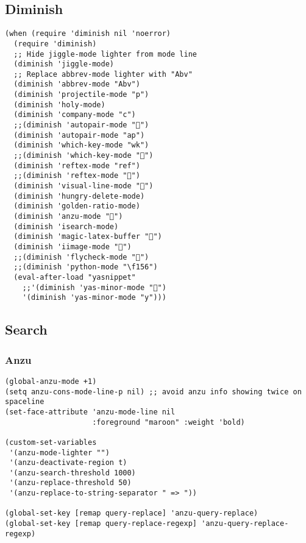 \documentclass[11pt]{article}
\begin{document}
\subsection{Diminish}
\label{sec:orgheadline25}
\begin{verbatim}
(when (require 'diminish nil 'noerror)
  (require 'diminish)
  ;; Hide jiggle-mode lighter from mode line
  (diminish 'jiggle-mode)
  ;; Replace abbrev-mode lighter with "Abv"
  (diminish 'abbrev-mode "Abv")
  (diminish 'projectile-mode "p")
  (diminish 'holy-mode)
  (diminish 'company-mode "c")
  ;;(diminish 'autopair-mode "")
  (diminish 'autopair-mode "ap")
  (diminish 'which-key-mode "wk")
  ;;(diminish 'which-key-mode "")
  (diminish 'reftex-mode "ref")
  ;;(diminish 'reftex-mode "")
  (diminish 'visual-line-mode "")
  (diminish 'hungry-delete-mode)
  (diminish 'golden-ratio-mode)
  (diminish 'anzu-mode "")
  (diminish 'isearch-mode)
  (diminish 'magic-latex-buffer "")
  (diminish 'iimage-mode "")
  ;;(diminish 'flycheck-mode "")
  ;;(diminish 'python-mode "\f156")
  (eval-after-load "yasnippet"
    ;;'(diminish 'yas-minor-mode "")
    '(diminish 'yas-minor-mode "y")))
\end{verbatim}
\subsection{Search}
\label{sec:orgheadline28}
\subsubsection{Anzu}
\label{sec:orgheadline26}
\begin{verbatim}
(global-anzu-mode +1)
(setq anzu-cons-mode-line-p nil) ;; avoid anzu info showing twice on spaceline
(set-face-attribute 'anzu-mode-line nil
                    :foreground "maroon" :weight 'bold)

(custom-set-variables
 '(anzu-mode-lighter "")
 '(anzu-deactivate-region t)
 '(anzu-search-threshold 1000)
 '(anzu-replace-threshold 50)
 '(anzu-replace-to-string-separator " => "))

(global-set-key [remap query-replace] 'anzu-query-replace)
(global-set-key [remap query-replace-regexp] 'anzu-query-replace-regexp)
\end{verbatim}
\end{document}
